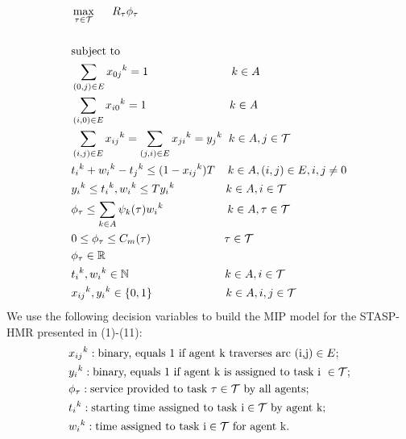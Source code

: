 \documentclass[conference]{IEEEtran}
\begin{document}
\begin{align}
&\displaystyle \max_{\tau \in \Tau}\hspace{0.5cm}R_\tau \phi_\tau \\ \notag\\
&\displaystyle \text{subject to} \notag \\
&\displaystyle \sum_{(0,j) \in E} {x_{0j}}^k  =  1\hspace{2.6cm}  {k \in A}\\ 
&\displaystyle \sum_{(i,0) \in E} {x_{i0}}^k  =  1 \hspace{2.6cm} {k \in A}\\ 
&\displaystyle \sum_{(i,j) \in E} {x_{ij}}^k  = \sum_{(j,i) \in E} {x_{ji}}^k = {y_j}^k \hspace{0.2cm} {k \in A,j \in \Tau}\\ 
&\displaystyle{{t_i}^k}+{{w_i}^k}-{{t_j}^k}\leq{(1-{{x_{ij}}^k})T} \hspace{0.4cm}{k \in A,(i,j) \in E,i,j \ne 0}\\
&{{y_i}^k} \leq {{t_i}^k},{{w_i}^k} \leq T{{y_i}^k}\hspace{1.6cm}  k \in A,i \in \Tau\\
&\phi_{\tau} \leq \sum_{k \in A} {\psi_k}(\tau){{w_i}^k} \hspace{2.0cm} k \in A,\tau \in \Tau\\
& 0 \leq \phi_{\tau} \leq C_{m}(\tau) \hspace{2.3cm} \tau \in \Tau \\
&\phi_{\tau} \in \mathbb{R} \\
&{{t_i}^k},{{w_i}^k} \in \mathbb{N}\hspace{3cm} k \in A,i \in \Tau\\
&{x_{ij}}^k,{y_i}^k \in \{0,1\} \hspace{2.3cm}k \in A,i,j \in \Tau
\end{align}
We use the following decision variables to build the MIP model for the STASP-HMR presented in (1)-(11):
\begin{align*}
&{x_{ij}}^k:\text{binary, equals 1 if agent k traverses arc (i,j)} \in E;\\
&{y_{i}}^k:\text{binary, equals 1 if agent k is assigned to task i } \in \mathcal{T};\\
&\phi_{\tau}:\text{service provided to task }\tau \in \mathcal{T} \text{ by all agents};\\
&{{t_i}^k}:\text{starting time assigned to task i} \in \mathcal{T} \text{ by agent k};\\
&{{w_i}^k}:\text{time assigned to task i} \in \mathcal{T} \text{ for agent k}.\\
\end{align*}
\end{document}
